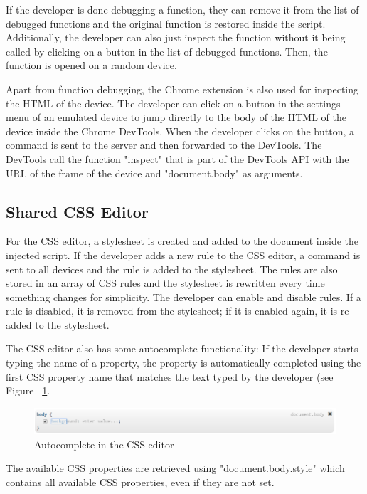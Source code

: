 If the developer is done debugging a function, they can remove it from the list of debugged functions and the original function is restored inside the script. Additionally, the developer can also just inspect the function without it being called by clicking on a button in the list of debugged functions. Then, the function is opened on a random device. 

Apart from function debugging, the Chrome extension is also used for inspecting the HTML of the device. The developer can click on a button in the settings menu of an emulated device to jump directly to the body of the HTML of the device inside the Chrome DevTools. When the developer clicks on the button, a command is sent to the server and then forwarded to the DevTools. The DevTools call the function "inspect" that is part of the DevTools API with the URL of the frame of the device and "document.body" as arguments.

\subsection{Shared CSS Editor}

For the CSS editor, a stylesheet is created and added to the document inside the injected script. If the developer adds a new rule to the CSS editor, a command is sent to all devices and the rule is added to the stylesheet. The rules are also stored in an array of CSS rules and the stylesheet is rewritten every time something changes for simplicity. The developer can enable and disable rules. If a rule is disabled, it is removed from the stylesheet; if it is enabled again, it is re-added to the stylesheet.

The CSS editor also has some autocomplete functionality: If the developer starts typing the name of a property, the property is automatically completed using the first CSS property name that matches the text typed by the developer (see Figure ~\ref{fig:css_autocomplete}.

\begin{figure}[H]
  \centering
    \includegraphics[width=1.0\textwidth]{images/screenshots/css_autocomplete.png}
	\caption{Autocomplete in the CSS editor}
	\label{fig:css_autocomplete}
\end{figure}

The available CSS properties are retrieved using "document.body.style" which contains all available CSS properties, even if they are not set.

